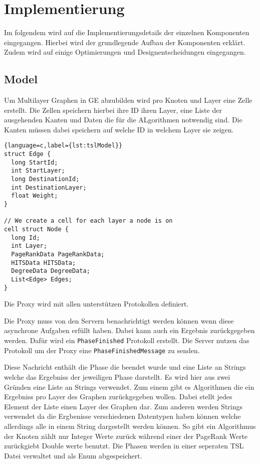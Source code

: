 \section{Implementierung}

Im folgendem wird auf die Implementierungsdetails der einzelnen Komponenten eingegangen. Hierbei wird der grundlegende Aufbau der Komponenten erklärt.
Zudem wird auf einige Optimierungen und Designentscheidungen eingegangen.


\subsection{Model}

Um Multilayer Graphen in GE abzubilden wird pro Knoten und Layer eine Zelle erstellt. Die Zellen speichern hierbei ihre ID ihren Layer, eine Liste der ausgehenden Kanten und Daten die für die ALgorithmen notwendig sind.
Die Kanten müssen dabei speichern auf welche ID in welchem Layer sie zeigen.

\begin{lstlisting}{language=c,label={lst:tslModel}}
struct Edge {
  long StartId;
  int StartLayer;
  long DestinationId;
  int DestinationLayer;
  float Weight;
}

// We create a cell for each layer a node is on
cell struct Node {
  long Id;
  int Layer;
  PageRankData PageRankData;
  HITSData HITSData;
  DegreeData DegreeData;
  List<Edge> Edges;
}
\end{lstlisting}

Die Proxy wird mit allen unterstützen Protokollen definiert. 

Die Proxy muss von den Servern benachrichtigt werden können wenn diese asynchrone Aufgaben erfüllt haben. Dabei kann auch ein Ergebnis zurückgegeben werden.
Dafür wird ein \verb|PhaseFinished| Protokoll erstellt. Die Server nutzen das Protokoll um der Proxy eine \verb|PhaseFinishedMessage| zu senden.

Diese Nachricht enthält die Phase die beendet wurde und eine Liste an Strings welche das Ergebniss der jeweiligen Phase darstellt. Es wird hier aus zwei Gründen eine Liste an Strings verwendet. Zum einem gibt es Algorithmen die ein Ergebniss pro Layer des Graphen zurückgegeben wollen. Dabei stellt jedes Element der Liste einen Layer des Graphen dar. Zum anderen werden Strings verwendet da die Ergbenisse verschiedenen Datentypen haben können welche allerdings alle in einem String dargestellt werden können. So gibt ein Algorithmus der Knoten zählt nur Integer Werte zurück während einer der PageRank Werte zurückgiebt Double werte benutzt.
Die Phasen werden in einer seperaten TSL Datei verwaltet und als Enum abgespeichert.

